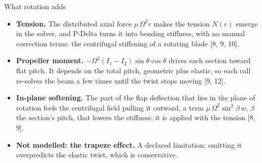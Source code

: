 \begin{frame}{What rotation adds}
\begin{itemize}\small
  \item \textbf{Tension.} The distributed axial force \(\mu\,\Omega^2 r\)
        makes the tension \(N(r)\) emerge in the solver, and P-Delta turns it
        into bending stiffness, with no manual correction terms: the
        centrifugal stiffening of a rotating blade [8, 9, 10].
  \item \textbf{Propeller moment.} \(-\Omega^2 (I_1 - I_2)\sin\theta\cos\theta\)
        drives each section toward flat pitch. It depends on the total pitch,
        geometric plus elastic, so each call re-solves the beam a few times
        until the twist stops moving [9, 12].
  \item \textbf{In-plane softening.} The part of the flap deflection that
        lies in the plane of rotation feels the centrifugal field pulling it
        outward, a term \(\mu\,\Omega^2 \sin^2\beta\,w\), \(\beta\) the
        section's pitch, that lowers the stiffness; it is applied with the
        tension [8, 9].
  \item \textbf{Not modelled: the trapeze effect.} A declared limitation;
        omitting it overpredicts the elastic twist, which is conservative.
\end{itemize}
\end{frame}

